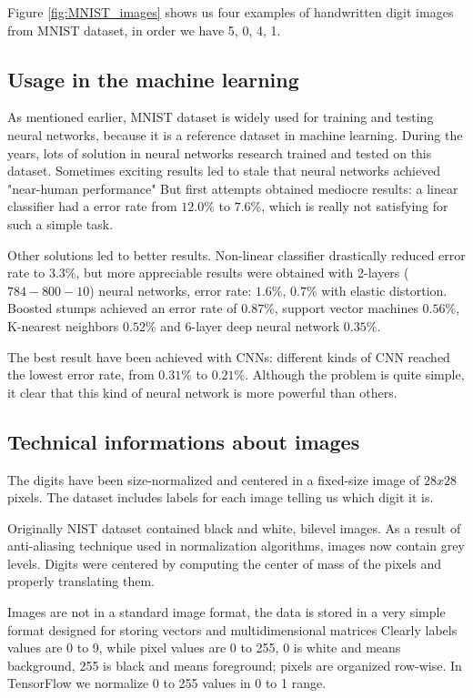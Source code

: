 Figure \ref{fig:MNIST_images} shows us four examples of handwritten digit images from MNIST dataset, in order we have 5, 0, 4, 1.

\subsection{Usage in the machine learning}

As mentioned earlier, MNIST dataset is widely used for training and testing neural networks, because it is a reference dataset in machine learning. During the years, lots of solution in neural networks research trained and tested on this dataset. Sometimes exciting results led to stale that neural networks achieved "near-human performance" But first attempts obtained mediocre results: a linear classifier had a error rate from $12.0 \%$ to $7.6 \%$, which is really not satisfying for such a simple task.

Other solutions led to better results. Non-linear classifier drastically reduced error rate to $3.3 \%$, but more appreciable results were obtained with 2-layers ($784-800-10$) neural networks, error rate: $1.6 \%$, $0.7 \%$ with elastic distortion. Boosted stumps achieved an error rate of $0.87 \%$, support vector machines $0.56 \%$, K-nearest neighbors $0.52 \%$ and 6-layer deep neural network $0.35 \%$.

The best result have been achieved with \acsp{CNN}: different kinds of \acs{CNN} reached the lowest error rate, from $0.31 \%$ to $0.21 \%$. Although the problem is quite simple, it clear that this kind of neural network is more powerful than others.

\subsection{Technical informations about images}

The digits have been size-normalized and centered in a fixed-size image of $28x28$ pixels. The dataset includes labels for each image telling us which digit it is.

Originally NIST dataset contained black and white, bilevel images. As a result of anti-aliasing technique used in normalization algorithms, images now contain grey levels. Digits were centered by computing the center of mass of the pixels and properly translating them.

Images are not in a standard image format, the data is stored in a very simple format designed for storing vectors and multidimensional matrices Clearly labels values are 0 to 9, while pixel values are 0 to 255, 0 is white and means background, 255 is black and means foreground; pixels are organized row-wise. In TensorFlow we normalize 0 to 255 values in 0 to 1 range.

